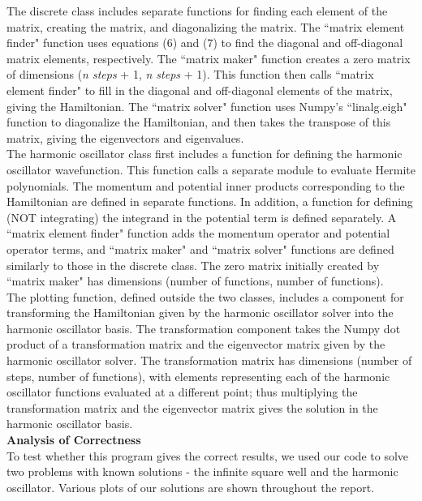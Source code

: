 \documentclass[%
 reprint,
 amsmath,amssymb,
 aps,
]{revtex4-1}
\begin{document}
\noindent The discrete class includes separate functions for finding each element of the matrix, creating the matrix, and diagonalizing the matrix.  The ``matrix element finder" function uses equations (6) and (7) to find the diagonal and off-diagonal matrix elements, respectively.  The ``matrix maker" function creates a zero matrix of dimensions (\textit{n steps} + 1, \textit{n steps} + 1).  This function then calls ``matrix element finder" to fill in the diagonal and off-diagonal elements of the matrix, giving the Hamiltonian.  The ``matrix solver" function uses Numpy's ``linalg.eigh" function to diagonalize the Hamiltonian, and then takes the transpose of this matrix, giving the eigenvectors and eigenvalues.\\

\noindent The harmonic oscillator class first includes a function for defining the harmonic oscillator wavefunction.  This function calls a separate module to evaluate Hermite polynomials.  The momentum and potential inner products corresponding to the Hamiltonian are defined in separate functions.  In addition, a function for defining (NOT integrating) the integrand in the potential term is defined separately.  A ``matrix element finder" function adds the momentum operator and potential operator terms, and ``matrix maker" and ``matrix solver" functions are defined similarly to those in the discrete class.  The zero matrix initially created by ``matrix maker" has dimensions (number of functions, number of functions).\\

\noindent The plotting function, defined outside the two classes, includes a component for transforming the Hamiltonian given by the harmonic oscillator solver into the harmonic oscillator basis.  The transformation component takes the Numpy dot product of a transformation matrix and the eigenvector matrix given by the harmonic oscillator solver.  The transformation matrix has dimensions (number of steps, number of functions), with elements representing each of the harmonic oscillator functions evaluated at a different point; thus multiplying the transformation matrix and the eigenvector matrix gives the solution in the harmonic oscillator basis.\\

\noindent \textbf{Analysis of Correctness}\\

\noindent To test whether this program gives the correct results, we used our code to solve two problems with known solutions - the infinite square well and the harmonic oscillator.  Various plots of our solutions are shown throughout the report.\\
\end{document}
